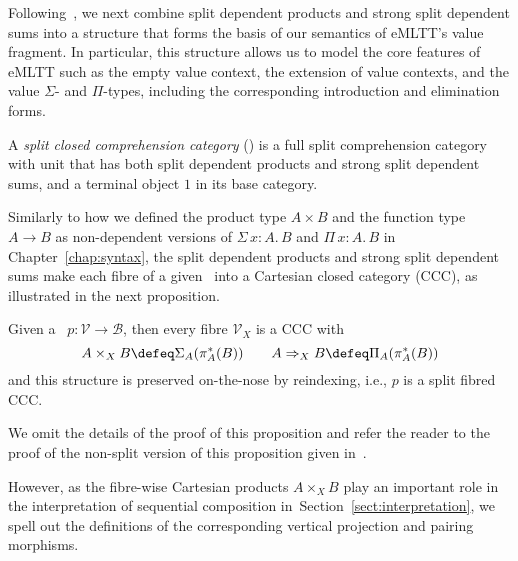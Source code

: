 Following~\cite[Section~10.5]{Jacobs:Book}, we next combine split dependent products and strong split dependent sums into a structure that forms the basis of our semantics of eMLTT's value fragment. In particular, this structure allows us to model the core features of eMLTT such as the empty value context, the extension of value contexts, and the value $\Sigma$- and $\Pi$-types, including the corresponding introduction and elimination forms. 

\begin{definition}
\label{def:sccompc}
A \emph{split closed comprehension category} (\SCCompC) is a full split comprehension category with unit that has both split dependent products and strong split dependent sums, and a terminal object $1$ in its base category.
\end{definition}

Similarly to how we defined the product type $A \times B$ and the function type $A \to B$ as non-dependent versions of $\Sigma\, x \!:\! A .\, B$ and $\Pi\, x \!:\! A .\, B$ in Chapter~\ref{chap:syntax}, the split dependent products and strong split dependent sums make each fibre of a given \SCCompC\, into a Cartesian closed category (CCC), as illustrated in the next proposition.

\pagebreak

\begin{proposition}
\label{prop:sccompc}
Given a \SCCompC ~$p : \mathcal{V} \longrightarrow \mathcal{B}$, then every fibre $\mathcal{V}_X$ is a CCC with
\[
A \times_X B \defeq \Sigma_A (\pi_A^*(B))
\qquad
A \Rightarrow_X B \defeq \Pi_A (\pi_A^*(B))
\]
and this structure is preserved on-the-nose by reindexing, i.e., $p$ is a split fibred CCC.
\end{proposition}

We omit the details of the proof of this proposition and refer the reader to the proof of the non-split version of this proposition given in~\cite[Proposition~10.5.4]{Jacobs:Book}.

However, as the fibre-wise Cartesian products $A \times_X B$ play an important role in the interpretation of sequential composition in~Section~\ref{sect:interpretation}, we spell out the definitions of the corresponding vertical projection and pairing morphisms.


